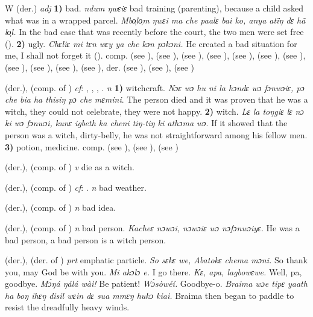 \begin{letter}{W}
 (der.) \textit{adj} \textbf{1)} bad. \textit{ndum ŋwɛiɛ} bad training (parenting), because a child asked what was in a wrapped parcel. \textit{Mbo̹lo̹m ŋwɛi ma che paalɛ bai ko, anya atïŋ dɛ hã lo̹l.} In the bad case that was recently before the court, the two men were set free (\citealt{Pichl1967}). \textbf{2)} ugly. \textit{Chɛliɛ mi tɛn wɛy ya che kɔn pɔkɔni.} He created a bad situation for me, I shall not forget it (\citealt{Pichl1967}). comp.  (see ),  (see ),  (see ),  (see ),  (see ),  (see ),  (see ),  (see ),  (see ),  (see ),  (see ), der.  (see ),  (see ),  (see )

 (der.), (comp. of ) \textit{cf}: , , , . \textit{n} \textbf{1)} witchcraft. \textit{Nɔɛ wɔ hu ni la hɔndɛ wɔ fɔnwɔiɛ, pɔ che bia ha thisiŋ pɔ che mɛmini}. The person died and it was proven that he was a witch, they could not celebrate, they were not happy. \textbf{2)} witch. \textit{Lɛ la toŋgiɛ lɛ nɔ ki wɔ fɔnwɔi, kunɛ igbeth ka cheni tiŋ-tiŋ ki athɔma wɔ}. If it showed that the person was a witch, dirty-belly, he was not straightforward among his fellow men. \textbf{3)} potion, medicine. comp.  (see ),  (see ),  (see )

 (der.), (comp. of ) \textit{v} die as a witch.

 (der.), (comp. of ) \textit{cf}: . \textit{n} bad weather.

 (der.), (comp. of ) \textit{n} bad idea. 

 (der.), (comp. of ) \textit{n} bad person. \textit{Kacheɛ nɔwɔi, nɔwɔiɛ wɔ nɔfɔnwɔiyɛ.} He was a bad person, a bad person is a witch person.

 (der.), (der. of ) \textit{prt} emphatic particle. \textit{So sɛkɛ we, Abatokɛ chema mɔni.} So thank you, may God be with you. \textit{Mi akɔlɔ e.} I go there. \textit{Kɛ, apa, lagbowɛwe.} Well, pa, goodbye. \textit{Mɔ́ŋá ŋálá wàì!} Be patient! \textit{Wɔ̀sòwéí.} Goodbye-o. \textit{Braima wɔe tipɛ yaath ha boŋ ihɛŋ disil wɛin dɛ sua mmɛŋ hukɔ kiai.} Braima then began to paddle to resist the dreadfully heavy winds.


\end{letter}
